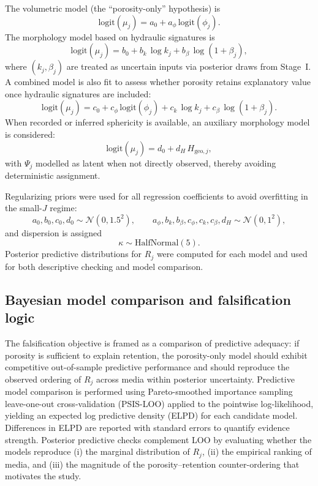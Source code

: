 \documentclass[11pt]{article}
\begin{document}
The volumetric model (the ``porosity-only'' hypothesis) is
\begin{equation}
\mathrm{logit}(\mu_j)=a_0 + a_\phi\,\mathrm{logit}(\phi_j).
\end{equation}
The morphology model based on hydraulic signatures is
\begin{equation}
\mathrm{logit}(\mu_j)=b_0 + b_k\,\log k_j + b_\beta\,\log(1+\beta_j),
\end{equation}
where $(k_j,\beta_j)$ are treated as uncertain inputs via posterior draws from Stage~I. A combined model is also fit to assess whether porosity retains explanatory value once hydraulic signatures are included:
\begin{equation}
\mathrm{logit}(\mu_j)=c_0 + c_\phi\,\mathrm{logit}(\phi_j) + c_k\,\log k_j + c_\beta\,\log(1+\beta_j).
\end{equation}
When recorded or inferred sphericity is available, an auxiliary morphology model is considered:
\begin{equation}
\mathrm{logit}(\mu_j)=d_0 + d_H\,H_{\mathrm{geo},j},
\end{equation}
with $\Psi_j$ modelled as latent when not directly observed, thereby avoiding deterministic assignment.

Regularizing priors were used for all regression coefficients to avoid overfitting in the small-$J$ regime:
\begin{equation}
a_0,b_0,c_0,d_0 \sim \mathcal{N}(0,1.5^2), \qquad a_\phi,b_k,b_\beta,c_\phi,c_k,c_\beta,d_H \sim \mathcal{N}(0,1^2),
\end{equation}
and dispersion is assigned
\begin{equation}
\kappa \sim \mathrm{HalfNormal}(5).
\end{equation}
Posterior predictive distributions for $R_j$ were computed for each model and used for both descriptive checking and model comparison.

\subsection{Bayesian model comparison and falsification logic}
The falsification objective is framed as a comparison of predictive adequacy: if porosity is sufficient to explain retention, the porosity-only model should exhibit competitive out-of-sample predictive performance and should reproduce the observed ordering of $R_j$ across media within posterior uncertainty. Predictive model comparison is performed using Pareto-smoothed importance sampling leave-one-out cross-validation (PSIS-LOO) applied to the pointwise log-likelihood, yielding an expected log predictive density (ELPD) for each candidate model. Differences in ELPD are reported with standard errors to quantify evidence strength. Posterior predictive checks complement LOO by evaluating whether the models reproduce (i) the marginal distribution of $R_j$, (ii) the empirical ranking of media, and (iii) the magnitude of the porosity--retention counter-ordering that motivates the study.
\end{document}
